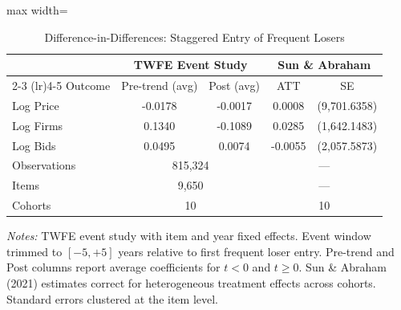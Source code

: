 \begin{table}[htbp]
\centering
\caption{Difference-in-Differences: Staggered Entry of Frequent Losers}
\label{tab:did_temporal}
\begin{adjustbox}{max width=\textwidth}
\begin{threeparttable}
\small
\begin{tabular}{lcccc}
\toprule
 & \multicolumn{2}{c}{TWFE Event Study} & \multicolumn{2}{c}{Sun \& Abraham} \\
\cmidrule(lr){2-3} \cmidrule(lr){4-5}
Outcome & Pre-trend (avg) & Post (avg) & ATT & SE \\
\midrule
Log Price & -0.0178 & -0.0017 & 0.0008 & (9,701.6358) \\
Log Firms & 0.1340 & -0.1089 & 0.0285 & (1,642.1483) \\
Log Bids & 0.0495 & 0.0074 & -0.0055 & (2,057.5873) \\
\midrule
Observations & \multicolumn{2}{c}{815,324} & \multicolumn{2}{c}{---} \\
Items & \multicolumn{2}{c}{9,650} & \multicolumn{2}{c}{---} \\
Cohorts & \multicolumn{2}{c}{10} & \multicolumn{2}{c}{10} \\
\bottomrule
\end{tabular}
\begin{tablenotes}
\small
\item \textit{Notes:} TWFE event study with item and year fixed effects.
Event window trimmed to $[-5, +5]$ years relative to first frequent loser entry.
Pre-trend and Post columns report average coefficients for $t < 0$ and $t \geq 0$.
Sun \& Abraham (2021) estimates correct for heterogeneous treatment effects
across cohorts. Standard errors clustered at the item level.
\end{tablenotes}
\end{threeparttable}
\end{adjustbox}
\end{table}
